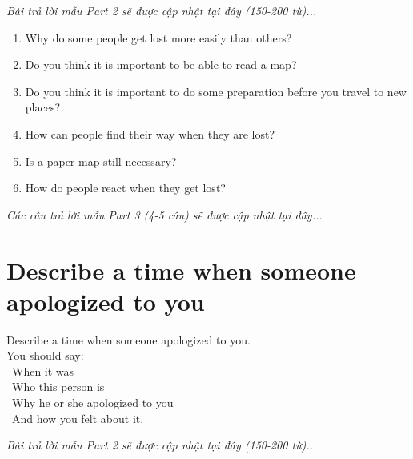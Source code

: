 \vspace{1em}
\textit{Bài trả lời mẫu Part 2 sẽ được cập nhật tại đây (150-200 từ)...}
\vspace{2em}

\begin{ieltsprompt}
\begin{enumerate}[itemsep=4pt]
    \item Why do some people get lost more easily than others?
    \item Do you think it is important to be able to read a map?
    \item Do you think it is important to do some preparation before you travel to new places?
    \item How can people find their way when they are lost?
    \item Is a paper map still necessary?
    \item How do people react when they get lost?
\end{enumerate}
\end{ieltsprompt}

\vspace{1em}
\textit{Các câu trả lời mẫu Part 3 (4-5 câu) sẽ được cập nhật tại đây...}
\vspace{2em}

\section{Describe a time when someone apologized to you}
\begin{ieltsprompt}
Describe a time when someone apologized to you. \\
You should say: \\
\textbullet\ When it was \\
\textbullet\ Who this person is \\
\textbullet\ Why he or she apologized to you \\
\textbullet\ And how you felt about it. \\
\end{ieltsprompt}

\vspace{1em}
\textit{Bài trả lời mẫu Part 2 sẽ được cập nhật tại đây (150-200 từ)...}
\vspace{2em}

